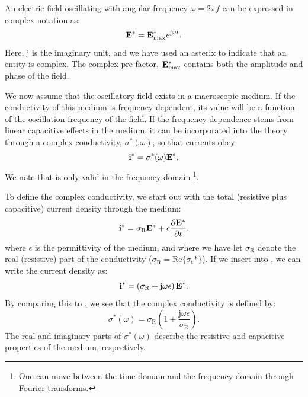 An electric field oscillating with angular frequency $\omega = 2\pi f$ 
can be expressed in complex notation as:
\begin{equation}
{\bf E}^* = {\bf E}_\text{max}^*e^{\mathrm{j}\omega t}.
\label{eq:Sigma:Eomega}
\end{equation}
Here, $\mathrm{j}$ is the imaginary unit, and we have used an asterix 
to indicate that an entity is complex. 
The complex pre-factor, ${\bf E}_\text{max}^*$ contains both the amplitude and phase of the field. 

We now assume that the oscillatory field exists in a macroscopic medium.
If the conductivity of this medium is frequency dependent, its value will be a function of the
oscillation frequency of the field. If the frequency dependence stems from linear capacitive effects in the medium,
it can be incorporated into the theory through a complex conductivity, 
$\sigma^*(\omega)$, so that currents obey:
\begin{equation}
{\bf i}^* = \sigma^*(\omega) {\bf E}^*.
\label{eq:Sigma:itot3}
\end{equation}
We note that  is only valid in the frequency domain
\footnote{One can move between the time domain and the frequency domain through Fourier transforms.}.

To define the complex conductivity, we start out with the total (resistive plus capacitive) 
current density through the medium:
\begin{equation}
{\bf i}^* = \sigma_\text{R}{\bf E}^* +  \epsilon \frac{\partial {\bf E}^*}{\partial t},
\label{eq:Sigma:itot}
\end{equation}
where $\epsilon$ is the permittivity of the medium, 
and where we have let $\sigma_\text{R}$ denote the real (resistive) part of the conductivity 
($\sigma_\text{R} = \mathrm{Re}\{\sigma_\text{t}*\}$).
If we insert  into , we can write the current density as:
\begin{equation}
{\bf i}^* = \left( \sigma_\text{R} + \mathrm{j}\omega \epsilon \right) {\bf E}^*.
\label{eq:Sigma:itot2}
\end{equation}
By comparing this to , we see that the complex conductivity is defined by:
\begin{equation}
\sigma^*(\omega) = \sigma_\text{R}\left(1 + \frac{\mathrm{j} \omega \epsilon}{\sigma_\text{R}} \right).
\label{eq:Sigma:complex}
\end{equation}
The real and imaginary parts of $\sigma^*(\omega)$ describe the 
resistive and capacitive properties of the medium, respectively. 

